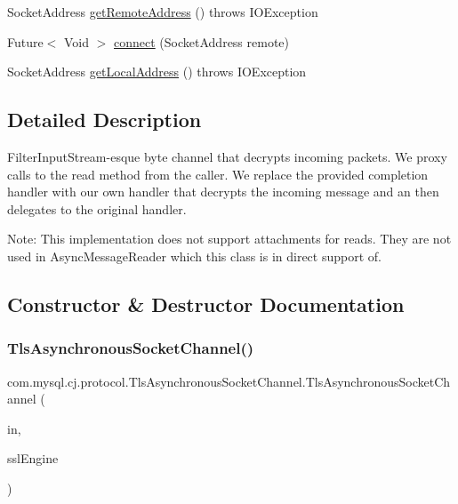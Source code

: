 \begin{DoxyCompactItemize}
\item 
Socket\+Address \mbox{\hyperlink{classcom_1_1mysql_1_1cj_1_1protocol_1_1_tls_asynchronous_socket_channel_ad458628a47ddb262e5efcda1de49b4bf}{get\+Remote\+Address}} ()  throws I\+O\+Exception 
\item 
Future$<$ Void $>$ \mbox{\hyperlink{classcom_1_1mysql_1_1cj_1_1protocol_1_1_tls_asynchronous_socket_channel_a07a1023446082150144586cbc90bde66}{connect}} (Socket\+Address remote)
\item 
Socket\+Address \mbox{\hyperlink{classcom_1_1mysql_1_1cj_1_1protocol_1_1_tls_asynchronous_socket_channel_a74341ff74719b5c1c38fc5391ce53082}{get\+Local\+Address}} ()  throws I\+O\+Exception 
\end{DoxyCompactItemize}


\subsection{Detailed Description}
Filter\+Input\+Stream-\/esque byte channel that decrypts incoming packets. We proxy calls to the read method from the caller. We replace the provided completion handler with our own handler that decrypts the incoming message and an then delegates to the original handler.

Note\+: This implementation does not support attachments for reads. They are not used in Async\+Message\+Reader which this class is in direct support of. 

\subsection{Constructor \& Destructor Documentation}
\mbox{\label{classcom_1_1mysql_1_1cj_1_1protocol_1_1_tls_asynchronous_socket_channel_ad896e5429f1178d46c958d0aa078c3cb}} 
\subsubsection{\texorpdfstring{Tls\+Asynchronous\+Socket\+Channel()}{TlsAsynchronousSocketChannel()}}
{\footnotesize\ttfamily com.\+mysql.\+cj.\+protocol.\+Tls\+Asynchronous\+Socket\+Channel.\+Tls\+Asynchronous\+Socket\+Channel (\begin{DoxyParamCaption}\item[{Asynchronous\+Socket\+Channel}]{in,  }\item[{S\+S\+L\+Engine}]{ssl\+Engine }\end{DoxyParamCaption})}

